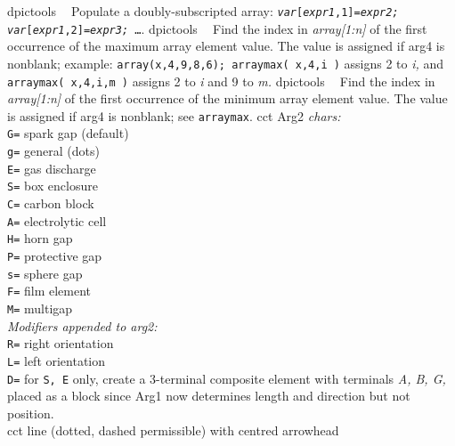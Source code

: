   {dpictools}%
  {$\;\;$  Populate a doubly-subscripted array:
    {\tt {\sl var}[{\sl expr1},1]={\sl expr2;}
         {\sl var}[{\sl expr1},2]={\sl expr3;} \ldots}.}%
%
  {dpictools}%
  {$\;\;$ Find the index in {\sl array[1:n]} of the first occurrence
   of the maximum array element value.  The value is assigned if arg4 is
   nonblank; example: 
   {\tt array(x,4,9,8,6); arraymax( x,4,i )}
    assigns 2 to {\sl i,} and {\tt arraymax( x,4,i,m )}
    assigns 2 to {\sl i} and 9 to {\sl m.}}%
%
  {dpictools}%
  {$\;\;$ Find the index in {\sl array[1:n]} of the first occurrence
   of the minimum array element value.  The value is assigned if arg4 is
   nonblank; see {\tt arraymax}.}%
%
  {cct}%
{Arg2 {\sl chars:}\\
    {\tt G=} spark gap (default)\\
    {\tt g=} general (dots)\\
    {\tt E=} gas discharge\\
    {\tt S=} box enclosure\\
    {\tt C=} carbon block\\
    {\tt A=} electrolytic cell\\
    {\tt H=} horn gap\\
    {\tt P=} protective gap\\
    {\tt s=} sphere gap\\
    {\tt F=} film element\\
    {\tt M=} multigap\\
    {\sl Modifiers appended to arg2:}\\
    {\tt R=} right orientation\\
    {\tt L=} left orientation\\
    {\tt D=} for {\tt S, E} only, create a 3-terminal composite element
      with terminals {\sl A, B, G,} placed as a block since Arg1 now determines
      length and direction but not position.\\
    }%
%
  {cct}%
  {line (dotted, dashed permissible) with centred arrowhead
    }%
%
